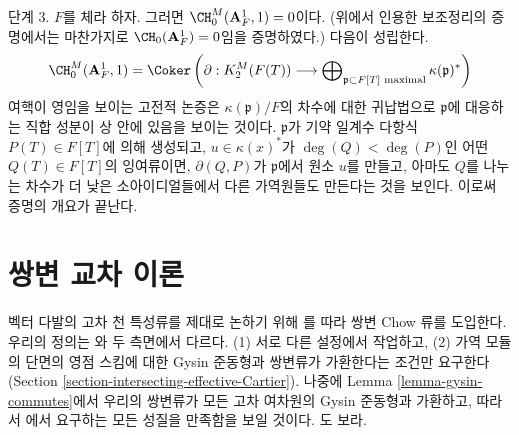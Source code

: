 \begin{remark}
\medskip\noindent
단계 3. $F$를 체라 하자. 그러면
$\CH^M_0(\mathbf{A}^1_F, 1) = 0$이다. (위에서 인용한 보조정리의
증명에서는 마찬가지로 $\CH_0(\mathbf{A}^1_F) = 0$임을 증명하였다.)
다음이 성립한다.
$$
\CH^M_0(\mathbf{A}^1_F, 1) = \Coker\left(
\partial : K^M_2(F(T)) \longrightarrow
\bigoplus\nolimits_{\mathfrak p \subset F[T]\text{ maximal}}
\kappa(\mathfrak p)^*\right)
$$
여핵이 영임을 보이는 고전적 논증은 $\kappa(\mathfrak p)/F$의 차수에
대한 귀납법으로 $\mathfrak p$에 대응하는 직합 성분이 상 안에 있음을
보이는 것이다. $\mathfrak p$가 기약 일계수 다항식
$P(T) \in F[T]$에 의해 생성되고, $u \in \kappa(x)^*$가
$\deg(Q) < \deg(P)$인 어떤 $Q(T) \in F[T]$의 잉여류이면,
$\partial(Q, P)$가 $\mathfrak p$에서 원소 $u$를 만들고, 아마도 $Q$를
나누는 차수가 더 낮은 소아이디얼들에서 다른 가역원들도 만든다는 것을
보인다. 이로써 증명의 개요가 끝난다.
\end{remark}











\section{쌍변 교차 이론}
\label{section-bivariant}

\noindent
벡터 다발의 고차 천 특성류를 제대로 논하기 위해 \cite{F}를 따라
쌍변 Chow 류를 도입한다. 우리의 정의는 \cite{F}와 두 측면에서 다르다.
(1) 서로 다른 설정에서 작업하고, (2) 가역 모듈의 단면의 영점 스킴에
대한 Gysin 준동형과 쌍변류가 가환한다는 조건만 요구한다
(Section \ref{section-intersecting-effective-Cartier}).
나중에 Lemma \ref{lemma-gysin-commutes}에서 우리의 쌍변류가 모든 고차
여차원의 Gysin 준동형과 가환하고, 따라서 \cite{F}에서 요구하는 모든
성질을 만족함을 보일 것이다. \cite[Theorem 17.1]{F}도 보라.

